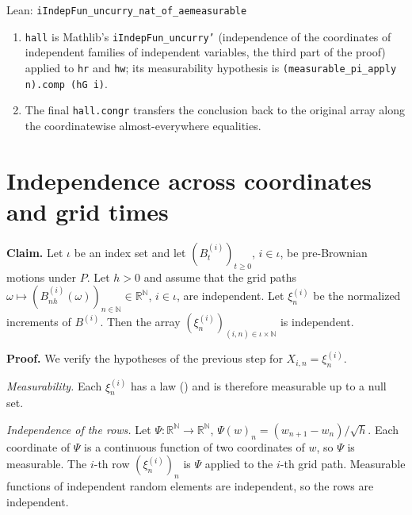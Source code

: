\documentclass[11pt,a4paper]{article}
\begin{document}
\begin{leanbox}{Lean: \texttt{iIndepFun\_\allowbreak{}uncurry\_\allowbreak{}nat\_\allowbreak{}of\_\allowbreak{}aemeasurable}}
\begin{enumerate}
\item \texttt{hall} is Mathlib's \texttt{i\allowbreak{}Indep\allowbreak{}Fun\_\allowbreak{}uncurry'} (independence of the coordinates of independent families of independent variables, the third part of the proof) applied to \texttt{hr} and \texttt{hw}; its measurability hypothesis is \texttt{(measurable\_\allowbreak{}pi\_\allowbreak{}apply n).\allowbreak{}comp (h\allowbreak{}G i)}.

\item The final \texttt{hall.\allowbreak{}congr} transfers the conclusion back to the original array along the coordinatewise almost-everywhere equalities.

\end{enumerate}
\end{leanbox}

\section{\texorpdfstring{Independence across coordinates and grid times}{Independence across coordinates and grid times}}


\textbf{Claim.} Let \(\iota\) be an index set and let \((B^{(i)}_t)_{t\ge0}\), \(i\in\iota\), be pre-Brownian motions under \(P\). Let \(h>0\) and assume that the grid paths \(\omega\mapsto(B^{(i)}_{nh}(\omega))_{n\in\mathbb N}\in\mathbb R^{\mathbb N}\), \(i\in\iota\), are independent. Let \(\xi^{(i)}_n\) be the normalized increments of \(B^{(i)}\). Then the array \((\xi^{(i)}_n)_{(i,n)\in\iota\times\mathbb N}\) is independent.




\textbf{Proof.} We verify the hypotheses of the previous step for \(X_{i,n}=\xi^{(i)}_n\).




\emph{Measurability.} Each \(\xi^{(i)}_n\) has a law (\cite[Section~3.31.2]{LangevinLean2026ULASC}) and is therefore measurable up to a null set.




\emph{Independence of the rows.} Let \(\Psi:\mathbb R^{\mathbb N}\to\mathbb R^{\mathbb N}\), \(\Psi(w)_n=(w_{n+1}-w_n)/\sqrt h\). Each coordinate of \(\Psi\) is a continuous function of two coordinates of \(w\), so \(\Psi\) is measurable. The \(i\)-th row \((\xi^{(i)}_n)_n\) is \(\Psi\) applied to the \(i\)-th grid path. Measurable functions of independent random elements are independent, so the rows are independent.
\end{document}
